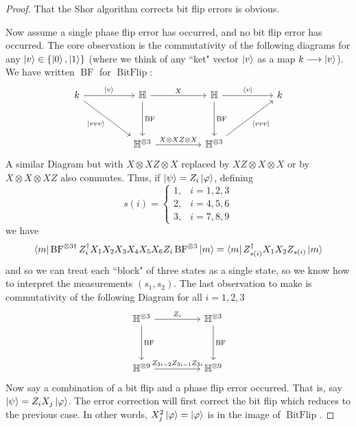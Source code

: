 \documentclass[12pt]{article}
\theoremstyle{plain}
\theoremstyle{definition}
\newcommand{\bb}[1]{\mathbb{#1}}
\newcommand{\lto}{\longrightarrow}
\begin{document}
\begin{proof}
	That the Shor algorithm corrects bit flip errors is obvious.
	
	Now assume a single phase flip error has occurred, and no bit flip error has occurred. The core observation is the commutativity of the following diagrams for any $\ket{v} \in \lbrace \ket{0},\ket{1}\rbrace$ (where we think of any ``ket" vector $\ket{v}$ as a map $k \lto \ket{v}$). We have written $\operatorname{BF}$ for $\operatorname{BitFlip}$:
	\begin{equation}
		\begin{tikzcd}[column sep = huge, row sep = huge]
			k\arrow[dr,swap,"{\ket{vvv}}"]\arrow[r,"{\ket{v}}"] & \bb{H}\arrow[r,"X"]\arrow[d,"{\operatorname{BF}}"] & \bb{H}\arrow[r,"{\bra{v}}"]\arrow[d,"{\operatorname{BF}}"] & k\\
			& \bb{H}^{\otimes 3}\arrow[r,"{X\otimes XZ \otimes X}"] & \bb{H}^{\otimes 3}\arrow[ur,swap,"{\bra{vvv}}"]
		\end{tikzcd}
	\end{equation}
	A similar Diagram but with $X\otimes XZ \otimes X$ replaced by $XZ\otimes X \otimes X$ or by $X\otimes X \otimes XZ$ also commutes. Thus, if $\ket{\psi} = Z_i\ket{\varphi}$, defining
	\begin{equation}
		s(i) =
		\begin{cases}
			1, & i = 1,2,3\\
			2, & i=4,5,6\\
			3, & i=7,8,9
		\end{cases}
	\end{equation}
	we have
	\begin{equation}
		\bra{m}\operatorname{BF}^{\otimes 3\dagger}Z_i^\dagger X_1X_2X_3X_4X_5X_6 Z_i \operatorname{BF}^{\otimes 3}\ket{m} = \bra{m}Z_{s(i)}^\dagger X_1X_2Z_{s(i)}\ket{m}
	\end{equation}
	and so we can treat each ``block" of three states as a single state, so we know how to interpret the measurements $(s_1,s_2)$. The last observation to make is commutativity of the following Diagram for all $i=1,2,3$
	\begin{equation}
		\begin{tikzcd}[column sep = huge, row sep = huge]
			\bb{H}^{\otimes 3}\arrow[r,"{Z_i}"]\arrow[d,"{\operatorname{BF}}"] & \bb{H}^{\otimes 3}\arrow[d,"{\operatorname{BF}}"]\\
			\bb{H}^{\otimes 9}\arrow[r,"{Z_{3i-2}Z_{3i-1}Z_{3i}}"] & \bb{H}^{\otimes 9}
		\end{tikzcd}
	\end{equation}
	Now say a combination of a bit flip and a phase flip error occurred. That is, say $\ket{\psi} = Z_iX_j\ket{\varphi}$. The error correction will first correct the bit flip which reduces to the previous case. In other words, $X_j^2 \ket{\varphi} = \ket{\varphi}$ is in the image of $\operatorname{BitFlip}$.
\end{proof}
	
\end{document}
